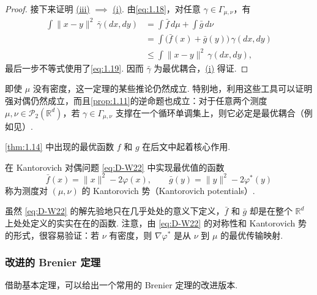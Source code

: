 \begin{proof}
接下来证明 \hyperref[item:1.14.iii]{(iii)} $\implies$ \hyperref[item:1.14.i]{(i)}. 由\eqref{eq:1.18}，对任意 $\gamma\in\Gamma_{\mu,\nu}$，有
$$
\begin{aligned}
\int\|x-y\|^2\,\bar\gamma(dx,dy)
&=\int\bar f\,d\mu+\int\bar g\,d\nu\\
&=\int\bigl(\bar f(x)+\bar g(y)\bigr)\,\gamma(dx,dy)\\
&\leq\int\|x-y\|^2\,\gamma(dx,dy),
\end{aligned}
$$
最后一步不等式使用了\eqref{eq:1.19}. 因而 $\bar\gamma$ 为最优耦合，\hyperref[item:1.14.i]{(i)} 得证.
\end{proof}

即使 $\mu$ 没有密度，这一定理的某些推论仍然成立. 特别地，利用这些工具可以证明强对偶仍然成立，而且\autoref{prop:1.11}的逆命题也成立：对于任意两个测度 $\mu,\nu\in\mathcal{P}_2(\mathbb{R}^d)$，若 $\gamma\in\Gamma_{\mu,\nu}$ 支撑在一个循环单调集上，则它必定是最优耦合（例如见\cite{ref17}）.

\autoref{thm:1.14} 中出现的最优函数 $f$ 和 $g$ 在后文中起着核心作用.

\begin{definition}[Kantorovich 势]\label{def:1.15}
在 Kantorovich 对偶问题 \eqref{eq:D-W22} 中实现最优值的函数
$$
\bar f(x)=\|x\|^2-2\varphi(x),\qquad
\bar g(y)=\|y\|^2-2\varphi^*(y)
$$
称为测度对 $(\mu,\nu)$ 的 Kantorovich 势（Kantorovich potentials）.
\end{definition}

虽然 \eqref{eq:D-W22} 的解先验地只在几乎处处的意义下定义，$\bar f$ 和 $\bar g$ 却是在整个 $\mathbb{R}^d$ 上处处定义的实实在在的函数. 注意，由 \eqref{eq:D-W22} 的对称性和 Kantorovich 势的形式，很容易验证：若 $\nu$ 有密度，则 $\nabla\varphi^*$ 是从 $\nu$ 到 $\mu$ 的最优传输映射.

\subsubsection{改进的 Brenier 定理}\label{sec:1.5.4}

借助基本定理，可以给出一个常用的 Brenier 定理的改进版本.

